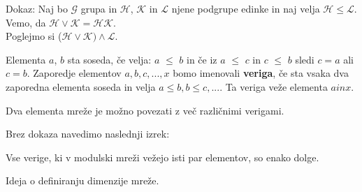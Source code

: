 \documentclass{beamer}
\begin{document}
\begin{frame}
\begin{block}{Dokaz:}
Naj bo $\mathcal{G}$ grupa in $\mathcal{H}$, $\mathcal{K}$ in $\mathcal{L}$ njene podgrupe edinke in naj velja $\mathcal{H} \leq \mathcal{L}$. Vemo, da $\mathcal{H} \lor \mathcal{K} =\mathcal{H}\mathcal{K}.$\\
Poglejmo si ($\mathcal{H} \lor \mathcal{K}) \land \mathcal{L}$.
\end{block}
\end{frame}

\begin{frame}
\begin{definition}
Elementa $a$, $b$ sta soseda, če velja: $a$ $\leq$ $b$ in če iz $a$ $\leq$ $c$ in $c$ $\leq$ $b$ sledi $c = a$ ali $c = b$.
Zaporedje elementov $a, b, c, ..., x$ bomo imenovali \textbf{veriga}, če sta vsaka dva zaporedna elementa soseda in velja $a \leq b, b \leq c, ...$. Ta veriga veže elementa $a in x.$
\end{definition}
\begin{block}{}
Dva elementa mreže je možno povezati z več različnimi verigami.
\end{block}
\end{frame}

\begin{frame}
\begin{block}{}
Brez dokaza navedimo naslednji izrek:
\end{block}
\begin{theorem}
Vse verige, ki v modulski mreži vežejo isti par elementov, so enako dolge.
\end{theorem}
\begin{block}{}
Ideja o definiranju dimenzije mreže.
\end{block}
\end{frame}
\end{document}

